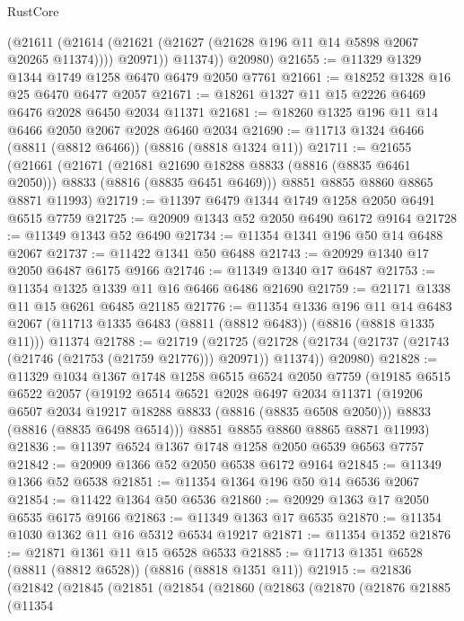 \begin{lexlean}{RustCore}
\begin{coremodule}
            (@21611
              (@21614 (@21621 (@21627 (@21628 @196 @11 @14 @5898 @2067 @20265 @11374))))
              @20971))
          @11374))
      @20980)
@21655 := @11329 @1329 @1344 @1749 @1258 @6470 @6479 @2050 @7761
@21661 := @18252 @1328 @16 @25 @6470 @6477 @2057
@21671 := @18261 @1327 @11 @15 @2226 @6469 @6476 @2028 @6450 @2034 @11371
@21681 := @18260 @1325 @196 @11 @14 @6466 @2050 @2067 @2028 @6460 @2034
@21690 := @11713 @1324 @6466 (@8811 (@8812 @6466)) (@8816 (@8818 @1324 @11))
@21711 := @21655
    (@21661
      (@21671
        (@21681 @21690 @18288 @8833 (@8816 (@8835 @6461 @2050)))
        @8833
        (@8816 (@8835 @6451 @6469)))
      @8851
      @8855
      @8860
      @8865
      @8871
      @11993)
@21719 := @11397 @6479 @1344 @1749 @1258 @2050 @6491 @6515 @7759
@21725 := @20909 @1343 @52 @2050 @6490 @6172 @9164
@21728 := @11349 @1343 @52 @6490
@21734 := @11354 @1341 @196 @50 @14 @6488 @2067
@21737 := @11422 @1341 @50 @6488
@21743 := @20929 @1340 @17 @2050 @6487 @6175 @9166
@21746 := @11349 @1340 @17 @6487
@21753 := @11354 @1325 @1339 @11 @16 @6466 @6486 @21690
@21759 := @21171 @1338 @11 @15 @6261 @6485 @21185
@21776 := @11354
    @1336
    @196
    @11
    @14
    @6483
    @2067
    (@11713 @1335 @6483 (@8811 (@8812 @6483)) (@8816 (@8818 @1335 @11)))
    @11374
@21788 := @21719
    (@21725
      (@21728 (@21734 (@21737 (@21743 (@21746 (@21753 (@21759 @21776))) @20971)) @11374))
      @20980)
@21828 := @11329
    @1034
    @1367
    @1748
    @1258
    @6515
    @6524
    @2050
    @7759
    (@19185
      @6515
      @6522
      @2057
      (@19192
        @6514
        @6521
        @2028
        @6497
        @2034
        @11371
        (@19206 @6507 @2034 @19217 @18288 @8833 (@8816 (@8835 @6508 @2050)))
        @8833
        (@8816 (@8835 @6498 @6514)))
      @8851
      @8855
      @8860
      @8865
      @8871
      @11993)
@21836 := @11397 @6524 @1367 @1748 @1258 @2050 @6539 @6563 @7757
@21842 := @20909 @1366 @52 @2050 @6538 @6172 @9164
@21845 := @11349 @1366 @52 @6538
@21851 := @11354 @1364 @196 @50 @14 @6536 @2067
@21854 := @11422 @1364 @50 @6536
@21860 := @20929 @1363 @17 @2050 @6535 @6175 @9166
@21863 := @11349 @1363 @17 @6535
@21870 := @11354 @1030 @1362 @11 @16 @5312 @6534 @19217
@21871 := @11354 @1352
@21876 := @21871 @1361 @11 @15 @6528 @6533
@21885 := @11713 @1351 @6528 (@8811 (@8812 @6528)) (@8816 (@8818 @1351 @11))
@21915 := @21836
    (@21842
      (@21845
        (@21851
          (@21854
            (@21860
              (@21863
                (@21870
                  (@21876
                    @21885
                    (@11354

\end{coremodule}
\end{lexlean}
